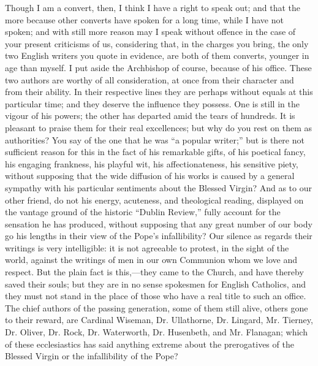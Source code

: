Though I am a convert, then, I think I have a right to speak out; and
that the more because other converts have spoken for a long time, while
I have not spoken; and with still more reason may I speak without
offence in the case of your present criticisms of us, considering that,
in the charges you bring, the only two English writers you quote in
evidence, are both of them converts, younger in age than myself. I put
aside the Archbishop of course, because of his office. These two authors
are worthy of all consideration, at once from their character and from
their ability. In their respective lines they are perhaps without equals
at this particular time; and they deserve the influence they possess.
One is still in the vigour of his powers; the other has departed amid
the tears of hundreds. It is pleasant to praise them for their real
excellences; but why do you rest on them as authorities? You say of the
one that he was ``a popular writer;'' but is there not
sufficient reason for this in the fact of his remarkable gifts, of his
poetical fancy, his engaging frankness, his playful wit, his
affectionateness, his sensitive piety, without supposing that the wide
diffusion of his works is caused by a general sympathy with his
particular sentiments about the Blessed Virgin? And as to our other
friend, do not his energy, acuteness, and theological reading, displayed
on the vantage ground of the historic ``Dublin Review,'' fully
account for the sensation he has produced, without supposing that any
great number of our body go his lengths in their view of the Pope's
infallibility? Our silence as regards their writings is very
intelligible: it is not agreeable to protest, in the sight of the world,
against the writings of men in our own Communion whom we love and
respect. But the plain fact is this,—they came to the Church, and have
thereby saved their souls; but they are in no sense spokesmen for
English Catholics, and they must not stand in the place of those who
have a real title to such an office. The chief authors of the passing
generation, some of them still alive, others gone to their reward, are
Cardinal Wiseman, Dr. Ullathorne, Dr. Lingard, Mr. Tierney, Dr. Oliver,
Dr. Rock, Dr. Waterworth, Dr. Husenbeth, and Mr. Flanagan; which of
these ecclesiastics has said anything extreme about the prerogatives of
the Blessed Virgin or the infallibility of the Pope?

